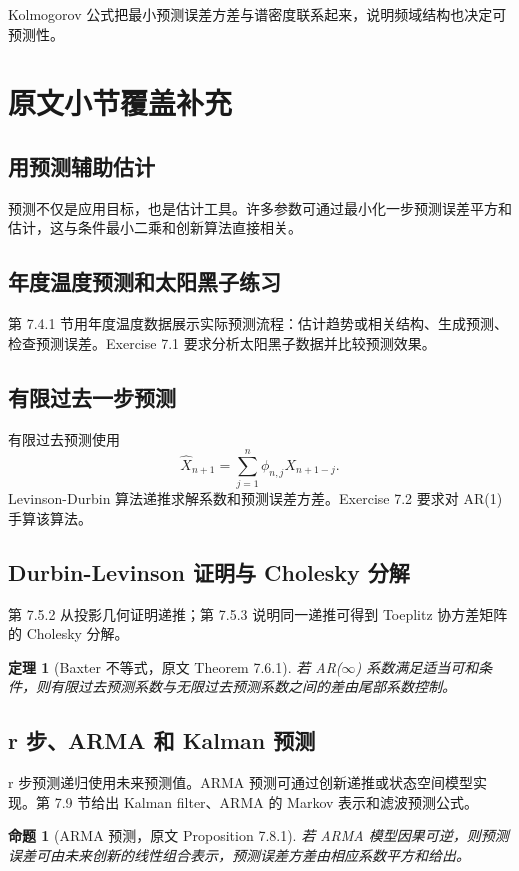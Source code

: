 \documentclass[11pt,a4paper,openany]{ctexbook}
\newtheorem{theorem}{定理}[section]
\newtheorem{proposition}{命题}[section]
\begin{document}
Kolmogorov 公式把最小预测误差方差与谱密度联系起来，说明频域结构也决定可预测性。

\section{原文小节覆盖补充}

\subsection{用预测辅助估计}
预测不仅是应用目标，也是估计工具。许多参数可通过最小化一步预测误差平方和估计，这与条件最小二乘和创新算法直接相关。

\subsection{年度温度预测和太阳黑子练习}
第 7.4.1 节用年度温度数据展示实际预测流程：估计趋势或相关结构、生成预测、检查预测误差。Exercise 7.1 要求分析太阳黑子数据并比较预测效果。

\subsection{有限过去一步预测}
有限过去预测使用
\[
  \hat X_{n+1}=\sum_{j=1}^n\phi_{n,j}X_{n+1-j}.
\]
Levinson-Durbin 算法递推求解系数和预测误差方差。Exercise 7.2 要求对 AR(1) 手算该算法。

\subsection{Durbin-Levinson 证明与 Cholesky 分解}
第 7.5.2 从投影几何证明递推；第 7.5.3 说明同一递推可得到 Toeplitz 协方差矩阵的 Cholesky 分解。

\begin{theorem}[Baxter 不等式，原文 Theorem 7.6.1]
若 AR(\(\infty\)) 系数满足适当可和条件，则有限过去预测系数与无限过去预测系数之间的差由尾部系数控制。
\end{theorem}

\subsection{r 步、ARMA 和 Kalman 预测}
r 步预测递归使用未来预测值。ARMA 预测可通过创新递推或状态空间模型实现。第 7.9 节给出 Kalman filter、ARMA 的 Markov 表示和滤波预测公式。

\begin{proposition}[ARMA 预测，原文 Proposition 7.8.1]
若 ARMA 模型因果可逆，则预测误差可由未来创新的线性组合表示，预测误差方差由相应系数平方和给出。
\end{proposition}
\end{document}
